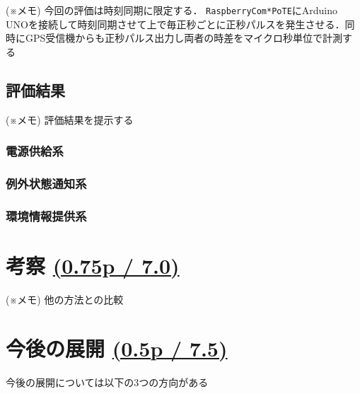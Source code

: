 (※メモ) 今回の評価は時刻同期に限定する． {\tt Raspberry\-Com*PoTE}にArduino UNOを接続して時刻同期させて上で毎正秒ごとに正秒パルスを発生させる．同時にGPS受信機からも正秒パルス出力し両者の時差をマイクロ秒単位で計測する



\subsection{評価結果}

(※メモ) 評価結果を提示する\\

\subsubsection{電源供給系}



\subsubsection{例外状態通知系}


\subsubsection{環境情報提供系}


\section{考察 \small{\underline{(0.75p / 7.0)}}}
\label{sec:06discussion}

(※メモ) 他の方法との比較
\\


\section{今後の展開 \small{\underline{(0.5p / 7.5)}}}
\label{sec:07nextstep}

今後の展開については以下の3つの方向がある

